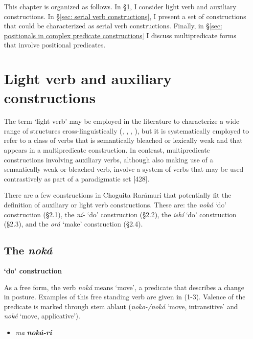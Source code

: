 This chapter is organized as follows. In §\ref{sec: light verb and auxiliary constructions}, I consider light verb and auxiliary constructions. In §\ref{sec: serial verb constructions}, I present a set of constructions that could be characterized as serial verb constructions. Finally, in §\ref{sec: positionals in complex predicate constructions} I discuss multipredicate forms that involve positional predicates. 

\section{Light verb and auxiliary constructions}
\label{sec: light verb and auxiliary constructions}

The term ‘light verb’ may be employed in the literature to characterize a wide range of structures cross-linguistically (\citealt{brugman2001light}, \citealt{brugman2001light}, \citealt{butt2001semi}, \citealt{bowern2004bardi}), but it is systematically employed to refer to a class of verbs that is semantically bleached or lexically weak and that appears in a multipredicate construction. In contrast, multipredicate constructions involving auxiliary verbs, although also making use of a semantically weak or bleached verb, involve a system of verbs that may be used contrastively as part of a paradigmatic set \citep{gaby2006grammar}[428].

There are a few constructions in Choguita Rarámuri that potentially fit the definition of auxiliary or light verb constructions. These are: the \textit{noká} ‘do’ construction (§2.1), the \textit{ní-} ‘do’ construction (§2.2), the \textit{ishí} ‘do’ construction (§2.3), and the \textit{orá} ‘make’ construction (§2.4).

\subsection{The \textit{noká} }\textbf{‘do’ construction}
\label{subsec: the noka 'do' construction}

As a free form, the verb \textit{noká} means ‘move’, a predicate that describes a change in posture. Examples of this free standing verb are given in (1-3). Valence of the predicate is marked through stem ablaut (\textit{noko-/noká} ‘move, intransitive’ and \textit{noké} ‘move, applicative’).

\begin{itemize}
\item \textit{ma} \textbf{\textit{noká-ri}}
\end{itemize}


